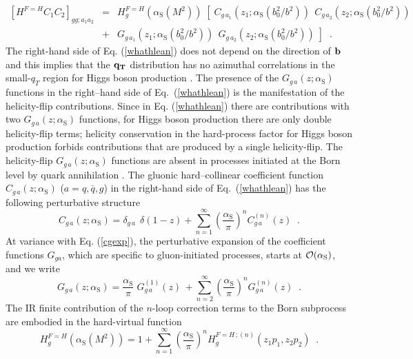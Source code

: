 \documentclass[12pt]{article}
\def\beeq{\begin{eqnarray}}
\def\eeeq{\end{eqnarray}}
\def\nn{\nonumber}
\newcommand\as{\alpha_{\mathrm{S}}}
\newcommand\f[2]{\frac{#1}{#2}}
\def\qt{q_T}
\def\bqt{{\bf q_T}}
\begin{document}
\beeq
\label{whathlean}
\left[ H^{F=H} C_1 C_2 \right]_{gg;a_{1}a_{2}}
&=& H_{g}^{F=H}(\as(M^2)) \;\left[ \; C_{g \,a_{1}}(z_1;\as(b_0^2/b^2)) 
\;\, C_{g \,a_{2}}(z_2;\as(b_0^2/b^2)) \right.
\nn \\
&+& \left.  G_{g \,a_{1}}(z_1;\as(b_0^2/b^2)) 
\;\, G_{g \,a_{2}}(z_2;\as(b_0^2/b^2)) \;
\right]
\;\;. 
\eeeq 
The right-hand side of Eq. (\ref{whathlean}) does not depend on the direction of $\bf b$ and this implies that the $\bqt$ distribution has no azimuthal correlations in the small-$\qt$ region for Higgs boson production \cite{Catani:2010pd}. The presence of the $G_{g \,a}(z;\as)$ functions in the right--hand side of Eq.~(\ref{whathlean}) is the manifestation of the helicity-flip contributions. Since in Eq. (\ref{whathlean}) there are contributions with two $G_{g \,a}(z;\as)$ functions, for Higgs boson production there are only double helicity-flip terms; helicity conservation in the hard-process factor for Higgs boson production forbids contributions that are produced by a single helicity-flip. The helicity-flip $G_{g \,a}(z;\as)$ functions are absent in processes initiated at the Born level by quark annihilation \cite{Catani:2010pd}. The gluonic hard--collinear coefficient function $C_{g \,a}(z;\as)$ ($a=q,{\bar q},g$) in the right-hand side of Eq.~(\ref{whathlean}) has the following perturbative structure
\begin{equation}
\label{cgexp} 
C_{g \,a}(z;\as) = \delta_{g \,a} \;\,\delta(1-z) + 
\sum_{n=1}^\infty \left( \frac{\as}{\pi} \right)^n C_{g\, a}^{(n)}(z) \;\;.
\end{equation}
At variance with Eq. (\ref{cgexp}), the perturbative expansion of the coefficient functions $G_{ga}$, which are specific to gluon-initiated processes, starts at ${\cal O}(\as)$, and we write \cite{Catani:2010pd,Catani:2013tia}
\begin{equation}
\label{gfexp}
G_{g \,a}(z;\as) = \f{\as}{\pi} \;G_{g \,a}^{(1)}(z) \,+
\sum_{n=2}^\infty \left( \frac{\as}{\pi} \right)^n G_{g \,a}^{(n)}(z) \;\;.
\end{equation}
The IR finite contribution of the $n$-loop correction terms to the Born subprocess are embodied in the hard-virtual function
\begin{equation}
\label{hexp}
H_g^{F=H}(\as(M^{2})) = 1+ \sum_{n=1}^\infty 
\left( \frac{\as}{\pi} \right)^n 
H_g^{F=H \,;(n)}(z_1p_1, z_2p_2)
\;\;.
\end{equation} 
\end{document}

